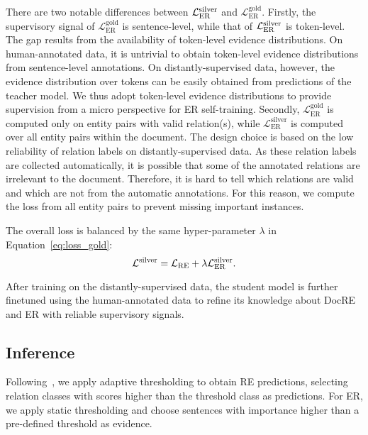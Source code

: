 \documentclass[11pt]{article}
\begin{document}
There are two notable differences between $\mathcal{L}^{\rm silver}_{\mathrm{ER}}$ and $\mathcal{L}_{\mathrm{ER}}^\mathrm{gold}$.
Firstly, the supervisory signal of $\mathcal{L}_{\mathrm{ER}}^\mathrm{gold}$ is sentence-level, while that of $\mathcal{L}^{\rm silver}_{\mathrm{ER}}$ is token-level.
The gap results from the availability of token-level evidence distributions.
On human-annotated data, it is untrivial to obtain token-level evidence distributions from sentence-level annotations.
On distantly-supervised data, however, the evidence distribution over tokens can be easily obtained from predictions of the teacher model.
We thus adopt token-level evidence distributions to provide supervision from a micro perspective for ER self-training.
Secondly, $\mathcal{L}_{\mathrm{ER}}^\mathrm{gold}$ is computed only on entity pairs with valid relation(s), while $\mathcal{L}_{\mathrm{ER}}^\mathrm{silver}$ is computed over all entity pairs within the document.
The design choice is based on the low reliability of relation labels on distantly-supervised data.
As these relation labels are collected automatically, it is possible that some of the annotated relations are irrelevant to the document.
Therefore, it is hard to tell which relations are valid and which are not from the automatic annotations.
For this reason, we compute the loss from all entity pairs to prevent missing important instances.


The overall loss is balanced by the same hyper-parameter $\lambda$ in Equation~\ref{eq:loss_gold}:
\begin{equation}
    \mathcal{L}^{\rm silver} = \mathcal{L}_{\mathrm{RE}} + \lambda\mathcal{L}_{\mathrm{ER}}^{\rm silver}.
\end{equation}

After training on the distantly-supervised data, the student model is further finetuned using the human-annotated data to refine its knowledge about DocRE and ER with reliable supervisory signals.
\subsection{Inference}

Following~\citet{zhou2021atlop}, we apply adaptive thresholding to obtain RE predictions, selecting relation classes with scores higher than the threshold class as predictions.
For ER, we apply static thresholding and choose sentences with importance higher than a pre-defined threshold as evidence.
\end{document}
